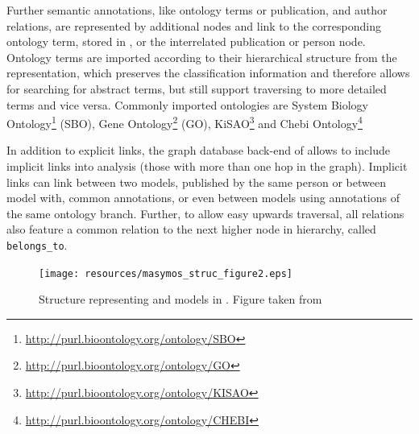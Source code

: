 Further semantic annotations, like ontology terms or publication, and author relations, are represented by additional nodes and link to the corresponding ontology term, stored in \neoj, or the interrelated publication or person node. 
Ontology terms are imported according to their hierarchical structure from the \owl representation, which preserves the classification information and therefore allows for searching for abstract terms, but still support traversing to more detailed terms and vice versa.
Commonly imported ontologies are System Biology Ontology\footnote{\url{http://purl.bioontology.org/ontology/SBO}} (SBO), Gene Ontology\footnote{\url{http://purl.bioontology.org/ontology/GO}} (GO), KiSAO\footnote{\url{http://purl.bioontology.org/ontology/KISAO}} and Chebi Ontology\footnote{\url{http://purl.bioontology.org/ontology/CHEBI}}

In addition to explicit links, the graph database back-end of \masymos allows to include implicit links into analysis (those with more than one hop in the graph). Implicit links can link between two models, published by the same person or between model with, common annotations, or even between models using annotations of the same ontology branch.
Further, to allow easy upwards traversal, all relations also feature a common relation to the next higher node in hierarchy, called \texttt{belongs\_to}.

\begin{figure}
	\centering
	\texttt{[image: resources/masymos\_struc\_figure2.eps]}
	\caption{Structure representing \sbml and \cellml models in \masymos. Figure taken from \citealt{Henkel2015}}
	\label{fig:background:graph-db:masymos}
\end{figure}

